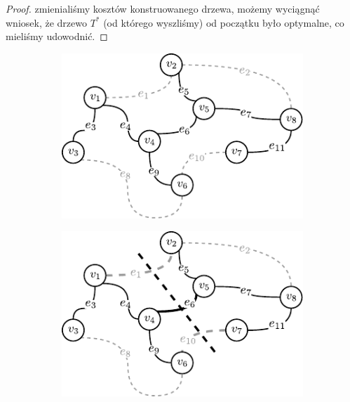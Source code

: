 \begin{proof}
zmienialiśmy kosztów konstruowanego drzewa, możemy wyciągnąć wniosek, że drzewo $T^{\ast}$ (od którego wyszliśmy) od początku było optymalne, co mieliśmy udowodnić.
\end{proof}

\begin{figure}[!htbp]
	\null\hfill
	\begin{subfigure}[b]{0.32\textwidth}
		\includegraphics[width=\textwidth]{Chapter_I/CUT-example/a}
		\caption{}
		\label{fig:cut:a}
	\end{subfigure}
	\hfill
	\begin{subfigure}[b]{0.32\textwidth}
		\includegraphics[width=\textwidth]{Chapter_I/CUT-example/b}
		\caption{}
		\label{fig:cut:b}
	\end{subfigure}
	\hfill
	\begin{subfigure}[b]{0.32\textwidth}

\end{subfigure}
\end{figure}
